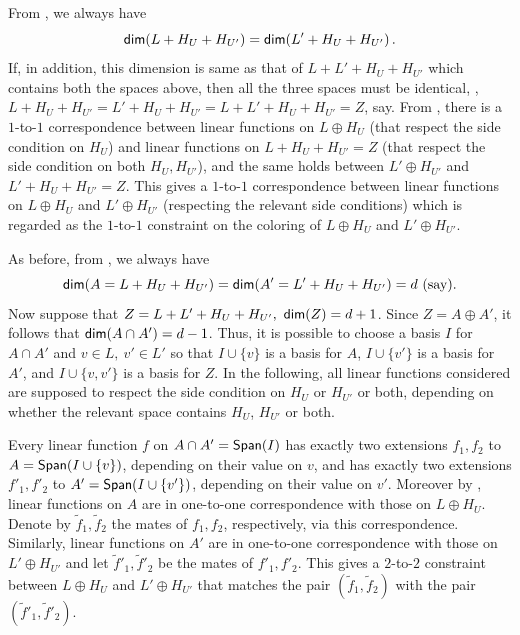 \documentclass{toc}
\newcommand*\xor{\mathbin{\oplus}}
\begin{document}
\medskip {} From , we always have
 $${\sf dim} (L + H_U + H_{U'}) = {\sf dim} (L' + H_U + H_{U'})\,.$$%
If, in addition, this dimension is same as that of $L + L' + H_U + H_{U'}$ which contains both the spaces above, then all the three spaces   must be identical, \ie,
$L + H_U + H_{U'} = L' + H_U + H_{U'} = L + L' + H_U + H_{U'} = Z$, say.
From , there is a $1$-to-$1$ correspondence between linear functions on $L\xor H_U$
(that respect the side condition on $H_U$) and linear functions on $L+ H_U + H_{U'}=Z$  (that respect the side condition on both $H_U, H_{U'}$), and the same holds
between $L' \xor  H_{U'}$ and $L' + H_U + H_{U'} = Z$.
This gives a $1$-to-$1$ correspondence between linear functions on $L\xor H_U$ and $L'\xor H_{U'}$ (respecting the relevant side conditions)
which is regarded as the $1$-to-$1$ constraint on the
%
coloring  %
of $L\xor H_U$ and $L'\xor H_{U'}$.


\medskip {} As before,
from , we always have
 $${\sf dim} (A = L + H_U + H_{U'}) = {\sf dim} (A' = L' + H_U + H_{U'}) = d ~\mbox{(say)}.$$
Now suppose that $Z = L + L' + H_U + H_{U'}, ~{\sf dim}(Z) = d+1$. Since $Z = A \xor A'$, it follows
that ${\sf dim}(A \cap A') = d-1$. Thus, it is possible to choose a basis $I$ for $A \cap A'$ and $v \in L, ~v' \in L'$
so that $I \cup \{ v \}$ is a basis for $A$,  $I \cup \{ v' \}$ is a  basis for $A'$, and $I \cup \{v, v'\}$ is a basis for $Z$. In the
following, all linear functions considered are supposed to respect the side condition on $H_U$ or $H_{U'}$ or both, depending on
whether the relevant space contains $H_U$, $H_{U'}$ or both.

Every linear function $f$ on $A \cap A' = {\sf Span}(I)$ has exactly two extensions $f_1, f_2$ to $A = {\sf Span}(I \cup \{v\})$,
depending on their value on $v$, and has exactly two extensions $f'_1, f'_2$ to $A' = {\sf Span}(I \cup \{v'\})$,
depending on their value on $v'$. Moreover by , linear functions on $A$ are in one-to-one correspondence with
those on $L\xor H_U$.
Denote by $\tilde{f}_1, \tilde{f}_2$ the mates of $f_1, f_2$, respectively, via this correspondence.  %
Similarly, linear functions on $A'$ are in one-to-one correspondence with
those on $L'\xor H_{U'}$ and let $\tilde{f}'_1, \tilde{f}'_2$ be the mates of $f'_1, f'_2$. This gives a $2$-to-$2$ constraint
between $L\xor H_U$ and $L' \xor H_{U'}$ that matches the pair $(\tilde{f}_1, \tilde{f}_2)$ with the pair $(\tilde{f}'_1, \tilde{f}'_2)$.
\end{document}
